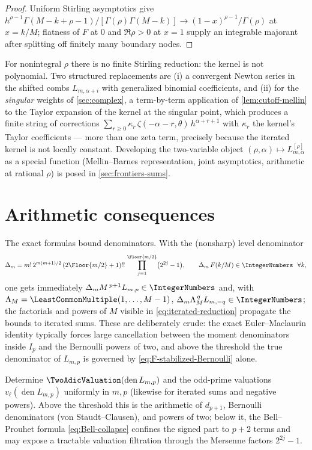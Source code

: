 \begin{proof}
Uniform Stirling asymptotics give
$h^{\rho-1}\Gamma(M-k+\rho-1)/[\Gamma(\rho)\Gamma(M-k)]
\to(1-x)^{\rho-1}/\Gamma(\rho)$ at $x=k/M$; flatness of $F$ at $0$
and $\Re\rho>0$ at $x=1$ supply an integrable majorant after
splitting off finitely many boundary nodes.
\end{proof}

For nonintegral $\rho$ there is no finite Stirling reduction: the
kernel is not polynomial.  Two structured replacements are (i) a
convergent Newton series in the shifted combs $L_{m,\alpha+i}$ with
generalized binomial coefficients, and (ii) for the \emph{singular}
weights of \cref{sec:complex}, a term-by-term application of
\cref{lem:cutoff-mellin} to the Taylor expansion of the kernel at the
singular point, which produces a finite string of corrections
$\sum_{r\ge0}\kappa_r\,\zeta(-\alpha-r,\theta)\,h^{\alpha+r+1}$ with
$\kappa_r$ the kernel's Taylor coefficients --- more than one zeta
term, precisely because the iterated kernel is not locally constant.
Developing the two-variable object
$(\rho,\alpha)\mapsto L^{[\rho]}_{m,\alpha}$ as a special function
(Mellin--Barnes representation, joint asymptotics, arithmetic at
rational $\rho$) is posed in \cref{sec:frontiers-sums}.

\section{Arithmetic consequences}
\label{sec:arithmetic-sums}

The exact formulas bound denominators.  With the (nonsharp) level
denominator
\begin{equation}
 \Delta_m
 =m!\,2^{m(m+1)/2}\,
 (2\Floor{m/2}+1)!!\,
 \prod_{j=1}^{\Floor{m/2}}\bigl(2^{2j}-1\bigr),
 \qquad
 \Delta_m\,F(k/M)\in\IntegerNumbers\ \ \forall k,
 \label{eq:DeltaN}
\end{equation}
one gets immediately $\Delta_mM^{\,p+1}L_{m,p}\in\IntegerNumbers$ and, with
$\Lambda_M=\LeastCommonMultiple(1,\dots,M-1)$,
$\Delta_m\Lambda_M^{\,q}L_{m,-q}\in\IntegerNumbers$; the factorials and powers of
$M$ visible in \eqref{eq:iterated-reduction} propagate the bounds to
iterated sums.  These are deliberately crude: the exact
Euler--Maclaurin identity typically forces large cancellation between
the moment denominators inside $I_p$ and the Bernoulli powers of two,
and above the threshold the true denominator of $L_{m,p}$ is governed
by \eqref{eq:F-stabilized-Bernoulli} alone.

\begin{problem}
\label{prob:sharp-valuations}
Determine $\TwoAdicValuation(\operatorname{den}L_{m,p})$ and the odd-prime
valuations $v_\ell(\operatorname{den}L_{m,p})$ uniformly in $m,p$
(likewise for iterated sums and negative powers).  Above the
threshold this is the arithmetic of $d_{p+1}$, Bernoulli
denominators (von Staudt--Clausen), and powers of two; below it, the
Bell--Prouhet formula \eqref{eq:Bell-collapse} confines the signed
part to $p+2$ terms and may expose a tractable valuation filtration
through the Mersenne factors $2^{2j}-1$.
\end{problem}

